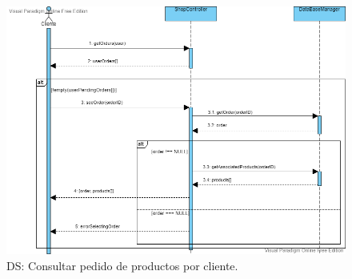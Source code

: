 \begin{figure}[H]
  \centering
  \includegraphics[scale=0.42]{images/Consultar_Pedido.png}
  \caption{DS: Consultar pedido de productos por cliente.}
  \label{DS1}
\end{figure}



